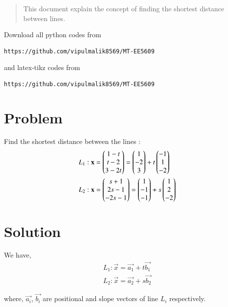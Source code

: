 \documentclass[journal,12pt,twocolumn]{IEEEtran}
\begin{document}
\date{\today}

\maketitle
\newpage
\bigskip
\renewcommand{\thefigure}{\theenumi}
\renewcommand{\thetable}{\theenumi}

\begin{abstract}
This document explain the concept of finding the shortest distance between lines.
\end{abstract}
Download all python codes from 
\begin{lstlisting}
https://github.com/vipulmalik8569/MT-EE5609
\end{lstlisting}
and latex-tikz codes from 
\begin{lstlisting}
https://github.com/vipulmalik8569/MT-EE5609
\end{lstlisting}

\section{\textbf{Problem}}

Find the shortest distance between the lines :
\begin{align}
L_1 :\mathbf{x} &= \begin{pmatrix} 1-t \\ t-2 \\ 3-2t \end{pmatrix} = \begin{pmatrix}1\\-2\\3\end{pmatrix}+ t\begin{pmatrix}-1\\1\\-2\end{pmatrix}\\
L_2 :\mathbf{x} &= \begin{pmatrix} s+1 \\ 2s-1 \\ -2s-1 \end{pmatrix} = \begin{pmatrix}1\\-1\\-1\end{pmatrix}+ s\begin{pmatrix}1\\2\\-2\end{pmatrix} 
\end{align}

\section{\textbf{Solution}}
We have,
\begin{align}
    L_1 : \vec{x}= \vec{a_1} + t \vec{b_1}\\
    L_2 : \vec{x}= \vec{a_2} + s \vec{b_2}
\end{align}

where, $\vec{a_i}$, $\vec{b_i}$ are positional and slope vectors of line $L_i$ respectively.\\
\end{document}
